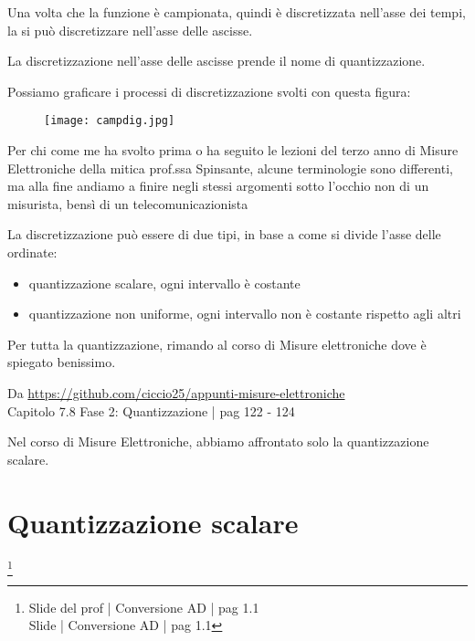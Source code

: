 Una volta che la funzione è campionata, quindi è discretizzata nell'asse dei tempi, la si può discretizzare nell'asse delle ascisse. \newline 

La discretizzazione nell'asse delle ascisse prende il nome di quantizzazione. \newline

\newpage 

Possiamo graficare i processi di discretizzazione svolti con questa figura: 

\begin{figure}[h]
    \centering
    \texttt{[image: campdig.jpg]}
\end{figure}

\begin{tcolorbox}
    Per chi come me ha svolto prima o ha seguito le lezioni del terzo anno di Misure Elettroniche della mitica prof.ssa Spinsante, 
    alcune terminologie sono differenti, ma alla fine andiamo a finire negli stessi argomenti sotto l'occhio non di un misurista, 
    bensì di un telecomunicazionista
\end{tcolorbox}

La discretizzazione può essere di due tipi, in base a come si divide l'asse delle ordinate: 

\begin{itemize}
    \item quantizzazione scalare, ogni intervallo è costante 
    \item quantizzazione non uniforme, ogni intervallo non è costante rispetto agli altri
\end{itemize}

\begin{tcolorbox}
    Per tutta la quantizzazione, rimando al corso di Misure elettroniche dove è spiegato benissimo. \newline  
    
    Da  \url{https://github.com/ciccio25/appunti-misure-elettroniche} \\
    Capitolo 7.8 Fase 2: Quantizzazione | pag 122 - 124 \newline 

    Nel corso di Misure Elettroniche, abbiamo affrontato solo la quantizzazione scalare. 
\end{tcolorbox}

\newpage 

\section{Quantizzazione scalare}
\footnote{Slide del prof | Conversione AD | pag 1.1 \\ 
Slide | Conversione AD | pag 1.1 
}


